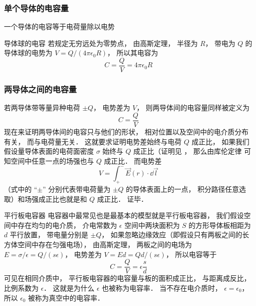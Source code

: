 
\subsubsection{单个导体的电容量}

一个导体的电容等于电荷量除以电势

\begin{exam}{导体球的电容}
若规定无穷远处为零势点， 由高斯定理， 半径为 $R$， 带电为 $Q$ 的导体球的电势为 $V = Q/(4\pi\epsilon_0 R)$， 所以其电容为
\begin{equation}
C = \frac{Q}{V} = 4\pi\epsilon_0 R
\end{equation}
\end{exam}


\subsubsection{两导体之间的电容量}
若两导体带等量异种电荷 $\pm Q$， 电势差为 $V$， 则两导体间的电容量同样被定义为
\begin{equation}
C = \frac{Q}{V}
\end{equation}
现在来证明两导体间的电容只与他们的形状， 相对位置以及空间中的电介质分布有关， 而与电荷量无关． 这就要求证明电势差始终与电荷 $Q$ 成正比， 如果我们假设量导体表面的电荷面密度 $\sigma$ 始终与 $Q$ 成正比（证明见%
， 那么由库伦定律%
可知空间中任意一点的场强也与 $Q$ 成正比． 而电势差
\begin{equation}
V = \int_+^- \vec E(r) \cdot \dd{\vec l}
\end{equation}
（式中的 “$\pm$” 分别代表带电荷量为 $\pm Q$ 的导体表面上的一点， 积分路径任意选取）和场强成正比也就是和 $Q$ 成正比． 证毕．

\begin{exam}{平行板电容器}
电容器中最常见也是最基本的模型就是平行板电容器， 我们假设空间中存在均匀的电介质， 介电常数为 $\epsilon$ 空间中两块面积为 $S$ 的方形导体板相距为 $d$ 平行放置， 带电量分别是 $\pm Q$， 如果忽略边缘效应（即假设只有两板之间的长方体空间中存在匀强电场）， 由高斯定理，%
两板之间的电场为 $E = {\sigma}/{\epsilon} = Q/(s\epsilon)$， 电势差为 $V = Ed = Qd/(s\epsilon)$， 所以电容等于
\begin{equation}
C = \frac{Q}{V} = \epsilon \frac sd
\end{equation}
可见在相同介质中， 平行板电容器的电容量与板的面积成正比， 与距离成反比， 比例系数为 $\epsilon$． 这就是为什么 $\epsilon$ 也被称为电容率． 当不存在电介质时， $\epsilon = \epsilon_0$， 所以 $\epsilon_0$ 被称为真空中的电容率．
\end{exam}